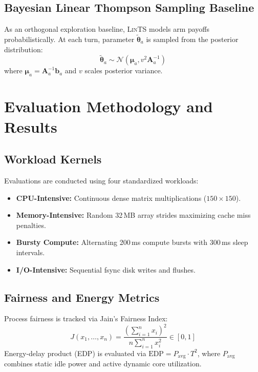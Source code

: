 \documentclass[conference]{IEEEtran}
\begin{document}
\subsection{Bayesian Linear Thompson Sampling Baseline}
As an orthogonal exploration baseline, \textsc{LinTS} models arm payoffs probabilistically. At each turn, parameter $\tilde{\boldsymbol{\theta}}_a$ is sampled from the posterior distribution:
\begin{equation}
\tilde{\boldsymbol{\theta}}_a \sim \mathcal{N}\left(\boldsymbol{\mu}_a, v^2 \mathbf{A}_a^{-1}\right)
\end{equation}
where $\boldsymbol{\mu}_a = \mathbf{A}_a^{-1} \mathbf{b}_a$ and $v$ scales posterior variance.

\section{Evaluation Methodology and Results}

\subsection{Workload Kernels}
Evaluations are conducted using four standardized workloads:
\begin{itemize}
    \item \textbf{CPU-Intensive:} Continuous dense matrix multiplications ($150 \times 150$).
    \item \textbf{Memory-Intensive:} Random 32\,MB array strides maximizing cache miss penalties.
    \item \textbf{Bursty Compute:} Alternating 200\,ms compute bursts with 300\,ms sleep intervals.
    \item \textbf{I/O-Intensive:} Sequential fsync disk writes and flushes.
\end{itemize}

\subsection{Fairness and Energy Metrics}
Process fairness is tracked via Jain's Fairness Index:
\begin{equation}
J(x_1, \dots, x_n) = \frac{\left(\sum_{i=1}^n x_i\right)^2}{n \sum_{i=1}^n x_i^2} \in [0, 1]
\end{equation}
Energy-delay product (EDP) is evaluated via $\text{EDP} = P_{\text{avg}} \cdot T^2$, where $P_{\text{avg}}$ combines static idle power and active dynamic core utilization.
\end{document}
